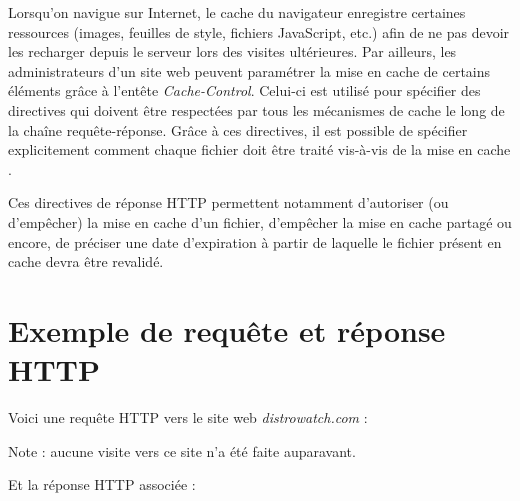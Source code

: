 Lorsqu'on navigue sur Internet, le cache du navigateur enregistre certaines ressources (images, feuilles de style, fichiers JavaScript, etc.) afin de ne pas devoir les recharger depuis le serveur lors des visites ultérieures. Par ailleurs, les administrateurs d'un site web peuvent paramétrer la mise en cache de certains éléments grâce à l'entête \textit{Cache-Control}. Celui-ci est utilisé pour spécifier des directives qui doivent être respectées par tous les mécanismes de cache le long de la chaîne requête-réponse. Grâce à ces directives, il est possible de spécifier explicitement comment chaque fichier doit être traité vis-à-vis de la mise en cache \cite{IETF_RFC2616}.

Ces directives de réponse HTTP permettent notamment d'autoriser (ou d'empêcher) la mise en cache d'un fichier, d'empêcher la mise en cache partagé ou encore, de préciser une date d'expiration à partir de laquelle le fichier présent en cache devra être revalidé.


\section{Exemple de requête et réponse HTTP}
\label{http_request_example}
Voici une requête HTTP vers le site web \textit{distrowatch.com} :

\begin{singlespacing}

\end{singlespacing}
Note : aucune visite vers ce site n'a été faite auparavant.
\newline

Et la réponse HTTP associée :

